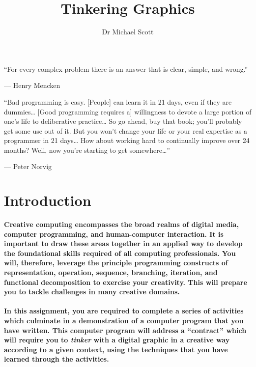 \documentclass{../../fal_assignment}
\title{Tinkering Graphics}
\author{Dr Michael Scott}
\begin{document}
\maketitle

\begin{marginquote}
``For every complex problem there is an answer that is clear, simple, and wrong.''

--- Henry Mencken

\marginquoterule

``Bad programming is easy. [People] can learn it in 21 days, even if they are dummies… [Good programming requires a] willingness to devote a large portion of one's life to deliberative practice… So go ahead, buy that book; you'll probably get some use out of it. But you won't change your life or your real expertise as a programmer in 21 days… How about working hard to continually improve over 24 months? Well, now you're starting to get somewhere…''
\par --- Peter Norvig

\end{marginquote}

\vspace{-3em}

\section*{Introduction}

\paragraph{Creative computing encompasses the broad realms of digital media, computer programming, and human-computer interaction. It is important to draw these areas together in an applied way to develop the foundational skills required of all computing professionals. You will, therefore, leverage the principle programming constructs of representation, operation, sequence, branching, iteration, and functional decomposition to exercise your creativity. This will prepare you to tackle challenges in many creative domains.}

\paragraph{In this assignment, you are required to complete a series of activities which culminate in a demonstration of a computer program that you have written. This computer program will address a ``contract'' which will require you to \textit{tinker} with a digital graphic in a creative way according to a given context, using the techniques that you have learned through the activities.}
\end{document}
